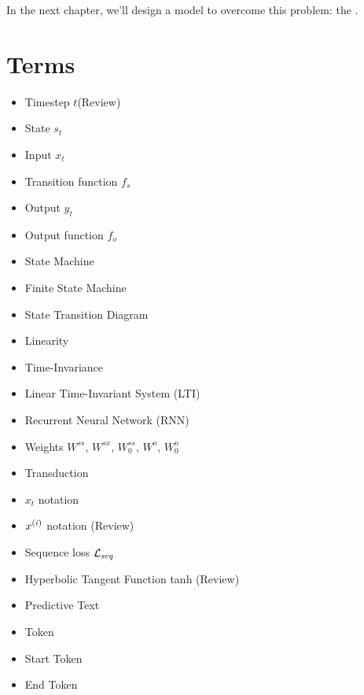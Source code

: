         In the next chapter, we'll design a model to overcome this problem: the .




\pagebreak

\section{Terms}

    \begin{itemize}
        \item Timestep $t$(Review)
        \item State $s_t$
        \item Input $x_t$
        \item Transition function $f_s$
        \item Output $y_t$
        \item Output function $f_o$
        \item State Machine
        \item Finite State Machine
        \item State Transition Diagram
        \item Linearity 
        \item Time-Invariance
        \item Linear Time-Invariant System (LTI)
        \item Recurrent Neural Network (RNN)
        \item Weights $W^{ss}$, $W^{sx}$, $W^{ss}_0$, $W^o$, $W^o_0$
        \item Transduction
        \item $x_t$ notation
        \item $x^{(i)}$ notation (Review)
        \item Sequence loss $\mathcal{L}_{seq}$
        \item Hyperbolic Tangent Function tanh (Review)
        \item Predictive Text
        \item Token
        \item Start Token 
        \item End Token
    \end{itemize}
        

        

        

        

        




